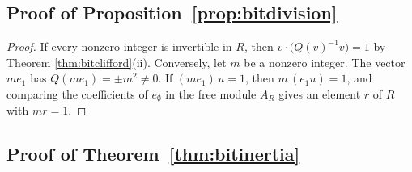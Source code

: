 \documentclass[11pt]{article}
\theoremstyle{plain}
\theoremstyle{definition}
\theoremstyle{plain}
\theoremstyle{definition}
\begin{document}
\subsection{\texorpdfstring{Proof of Proposition~\ref{prop:bitdivision}}{Proof of Proposition 5.1}}\label{prf:prop:bitdivision}

\begin{proof}
If every nonzero integer is invertible in $R$, then $v \cdot \bigl(Q(v)^{-1}v\bigr) = 1$ by Theorem \ref{thm:bitclifford}(ii). Conversely, let $m$ be a nonzero integer. The vector $m e_{1}$ has $Q(m e_{1}) = \pm m^{2} \neq 0$. If $(m e_{1})\,u = 1$, then $m\,(e_{1}u) = 1$, and comparing the coefficients of $e_{\emptyset}$ in the free module $A_{R}$ gives an element $r$ of $R$ with $m r = 1$.
\end{proof}

\subsection{\texorpdfstring{Proof of Theorem~\ref{thm:bitinertia}}{Proof of Theorem 6.1}}\label{prf:thm:bitinertia}
\end{document}
